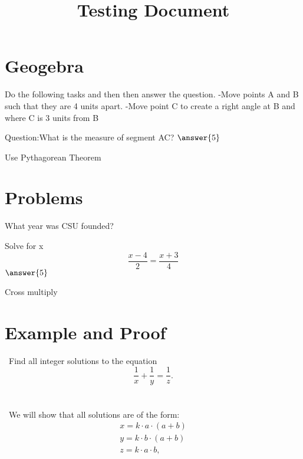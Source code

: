 \documentclass{ximera}
\title{Testing Document}
\begin{document}
\maketitle
\section{Geogebra}
\begin{problem}
Do the following tasks and then then answer the question.
    -Move points A and B such that they are 4 units apart.
    -Move point C to create a right angle at B and where C is 3 units from B
    
Question:What is the measure of segment AC?
$\answer{5}$
\begin{hint}
Use Pythagorean Theorem
\end{hint}
\end{problem}
\section{Problems}
\begin{problem}
\begin{multipleChoice}
What year was CSU founded?
\end{multipleChoice}
\begin{problem}
Solve for x
 \[\frac{x-4}{2}=\frac{x+3}{4}\]
$\answer{5}$
\begin{hint}
Cross multiply
\end{hint}
\end{problem}
\end{problem}

\section{Example and Proof}
\noindent \ Find all integer solutions to the equation
$$ \frac{1}{x} + \frac{1}{y} = \frac{1}{z}. $$ \\ \\

\noindent \ We will show that all solutions are of the form:
$$ \begin{array}{l}
x = k \cdot a \cdot \left(a + b\right) \\
y = k \cdot b \cdot \left(a + b\right) \\
z = k \cdot a \cdot b,
\end{array} $$
\end{document}
